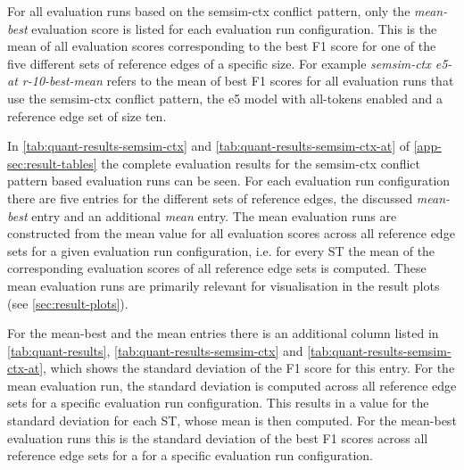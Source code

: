 \documentclass[11pt]{scrreprt}
\begin{document}
 For all evaluation runs based on the semsim-ctx conflict pattern, only the \textit{mean-best} evaluation score is listed for each evaluation run configuration. This is the mean of all evaluation scores corresponding to the best F1 score for one of the five different sets of reference edges of a specific size. For example \textit{semsim-ctx e5-at r-10-best-mean} refers to the mean of best F1 scores for all evaluation runs that use the semsim-ctx conflict pattern, the e5 model with all-tokens enabled and a reference edge set of size ten. 
 
 In \cref{tab:quant-results-semsim-ctx} and \cref{tab:quant-results-semsim-ctx-at} of \cref{app-sec:result-tables} the complete evaluation results for the semsim-ctx conflict pattern based evaluation runs can be seen. For each evaluation run configuration there are five entries for the different sets of reference edges, the discussed \textit{mean-best} entry and an additional \textit{mean} entry. The mean evaluation runs are constructed from the mean value for all evaluation scores across all reference edge sets for a given evaluation run configuration, i.e. for every ST the mean of the corresponding evaluation scores of all reference edge sets is computed. These mean evaluation runs are primarily relevant for visualisation in the result plots (see \cref{sec:result-plots}).

For the mean-best and the mean entries there is an additional column listed in \cref{tab:quant-results}, \cref{tab:quant-results-semsim-ctx} and \cref{tab:quant-results-semsim-ctx-at}, which shows the standard deviation of the F1 score for this entry. For the mean evaluation run, the standard deviation is computed across all reference edge sets for a specific evaluation run configuration. This results in a value for the standard deviation for each ST, whose mean is then computed. For the mean-best evaluation runs this is the standard deviation of the best F1 scores across all reference edge sets for a for a specific evaluation run configuration.
\end{document}
